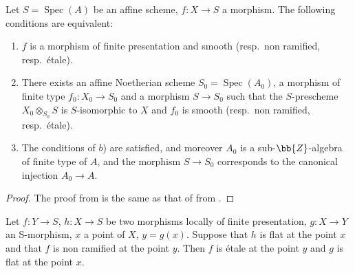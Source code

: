 \begin{corollary}[17.7.9]
\label{IV.17.7.9}
Let $S=\operatorname{Spec}(A)$ be an affine scheme, $f:X\to S$ a morphism.
The following conditions are equivalent:
\begin{enumerate}
  \item[a)] $f$ is a morphism of finite presentation and smooth (resp.\ non ramified, resp.\ \'etale).
  
  
  \item[b)] There exists an affine Noetherian scheme $S_0=\operatorname{Spec}(A_0)$, a morphism of finite type $f_0:X_0\to S_0$ and a morphism $S\to S_0$ such that the $S$-prescheme $X_0\otimes_{S_0} S$ is $S$-isomorphic to $X$ and $f_0$ is smooth (resp.\ non ramified, resp.\ \'etale).
  \item[c)] The conditions of $b$) are satisfied, and moreover $A_0$ is a sub-$\bb{Z}$-algebra of finite type of $A$, and the morphism $S\to S_0$ corresponds to the canonical injection $A_0\to A$.
\end{enumerate}
\end{corollary}

\begin{proof}
The proof from  is the same as that of  from .
\end{proof}

\begin{proposition}[17.7.10]
\label{IV.17.7.10}
Let $f:Y\to S$, $h:X\to S$ be two morphisms locally of finite presentation, $g:X\to Y$ an S-morphism, $x$ a point of $X$, $y=g(x)$.
Suppose that $h$ is flat at the point $x$ and that $f$ is non ramified at the point $y$.
Then $f$ is \'etale at the point $y$ and $g$ is flat at the point $x$.
\end{proposition}

